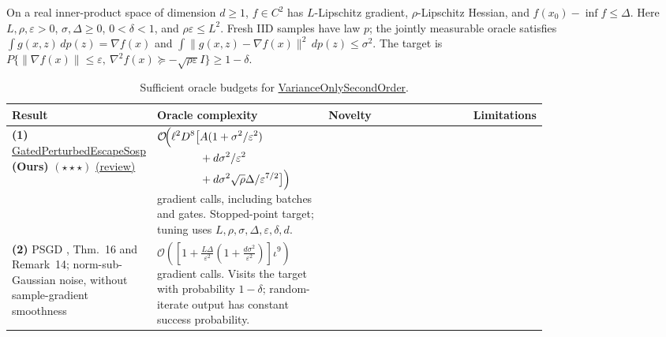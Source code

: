 \begin{table}[tp]
\centering
\caption{Sufficient oracle budgets for \href{https://github.com/k3nfalt/longtails/blob/main/LongTails/Setups/VarianceOnlySecondOrder.lean}{VarianceOnlySecondOrder}.}\label{tab:VarianceOnlySecondOrder}
\parbox{\linewidth}{\footnotesize On a real inner-product space of dimension $d\ge1$, $f\in C^2$ has $L$-Lipschitz gradient, $\rho$-Lipschitz Hessian, and $f(x_0)-\inf f\le\Delta$. Here $L,\rho,\varepsilon>0$, $\sigma,\Delta\ge0$, $0<\delta<1$, and $\rho\varepsilon\le L^2$. Fresh IID samples have law $p$; the jointly measurable oracle satisfies $\int g(x,z)\,dp(z)=\nabla f(x)$ and $\int\|g(x,z)-\nabla f(x)\|^2\,dp(z)\le\sigma^2$. The target is $P\{\|\nabla f(x)\|\le\varepsilon,\ \nabla^2f(x)\succeq-\sqrt{\rho\varepsilon}I\}\ge1-\delta$.}\par\smallskip
\begin{threeparttable}
\footnotesize
\setlength{\tabcolsep}{4pt}\renewcommand{\arraystretch}{1.25}
\begin{tabularx}{\linewidth}{@{}>{\raggedright\arraybackslash}p{0.20\linewidth}>{\raggedright\arraybackslash}p{0.32\linewidth}>{\raggedright\arraybackslash}p{0.27\linewidth}>{\raggedright\arraybackslash}X@{}}
\toprule
\textbf{Result} & \textbf{Oracle complexity} & \textbf{Novelty} & \textbf{Limitations} \\
\midrule
\textbf{(1)} \href{https://github.com/k3nfalt/longtails/blob/main/LongTails/Theorems/GatedPerturbedEscapeSosp.lean}{Gated\allowbreak Perturbed\allowbreak Escape\allowbreak Sosp} \textbf{(Ours)} $(\star\star\star)$ \href{https://github.com/k3nfalt/longtails/blob/main/scripts/reviews/GatedPerturbedEscapeSosp.md}{(review)}
& $\begin{aligned}\mathcal{O}\!\Bigl(\ell^2D^8\bigl[&A(1+\sigma^2/\varepsilon^2)\\&+d\sigma^2/\varepsilon^2\\&+d\sigma^2\sqrt{\rho}\Delta/\varepsilon^{7/2}\bigr]\Bigr)\end{aligned}$ gradient calls, including batches and gates. Stopped-point target; tuning uses $L,\rho,\sigma,\Delta,\varepsilon,\delta,d$.
& & \\
\midrule[1.2pt]
\textbf{(2)} PSGD \citep{vosJin2019v2}, Thm.~16 and Remark~14; norm-sub-Gaussian noise, without sample-gradient smoothness
& $\mathcal{O}\!\left(\left[1+\frac{L\Delta}{\varepsilon^2}\left(1+\frac{d\sigma^2}{\varepsilon^2}\right)\right]\iota^9\right)$ gradient calls. Visits the target with probability $1-\delta$; random-iterate output has constant success probability.

\end{tabularx}
\end{threeparttable}
\end{table}

